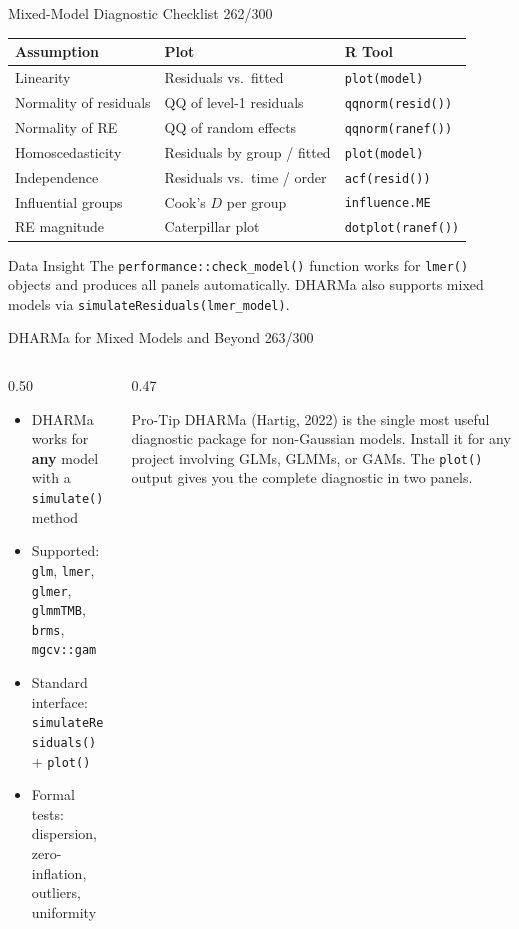 \documentclass[10pt]{beamer}
\newcommand{\smark}[1]{\hfill{\scriptsize\color{codegray}#1}}
\begin{document}
\begin{frame}{Mixed-Model Diagnostic Checklist}
\smark{262/300}
\centering\small
\begin{tabular}{@{}lll@{}}
    \toprule
    \textbf{Assumption} & \textbf{Plot} & \textbf{R Tool} \\
    \midrule
    Linearity              & Residuals vs.\ fitted         & \texttt{plot(model)} \\
    Normality of residuals & QQ of level-1 residuals       & \texttt{qqnorm(resid())} \\
    Normality of RE        & QQ of random effects           & \texttt{qqnorm(ranef())} \\
    Homoscedasticity       & Residuals by group / fitted    & \texttt{plot(model)} \\
    Independence           & Residuals vs.\ time / order    & \texttt{acf(resid())} \\
    Influential groups     & Cook's $D$ per group           & \texttt{influence.ME} \\
    RE magnitude           & Caterpillar plot               & \texttt{dotplot(ranef())} \\
    \bottomrule
\end{tabular}

\vspace{0.3cm}
\begin{exampleblock}{Data Insight}
    \scriptsize The \texttt{performance::check\_model()} function works for \texttt{lmer()} objects and produces all panels automatically. DHARMa also supports mixed models via \texttt{simulateResiduals(lmer\_model)}.
\end{exampleblock}
\end{frame}

\begin{frame}{DHARMa for Mixed Models and Beyond}
\smark{263/300}
\begin{columns}[T]
\begin{column}{0.50\textwidth}
\begin{itemize}
    \item DHARMa works for \textbf{any} model with a \texttt{simulate()} method
    \item Supported: \texttt{glm}, \texttt{lmer}, \texttt{glmer}, \texttt{glmmTMB}, \texttt{brms}, \texttt{mgcv::gam}
    \item Standard interface: \texttt{simulateResiduals()} + \texttt{plot()}
    \item Formal tests: dispersion, zero-inflation, outliers, uniformity
\end{itemize}
\end{column}
\begin{column}{0.47\textwidth}
\begin{alertblock}{Pro-Tip}
    \scriptsize DHARMa (Hartig, 2022) is the single most useful diagnostic package for non-Gaussian models. Install it for any project involving GLMs, GLMMs, or GAMs. The \texttt{plot()} output gives you the complete diagnostic in two panels.
\end{alertblock}
\end{column}
\end{columns}
\end{frame}
\end{document}
